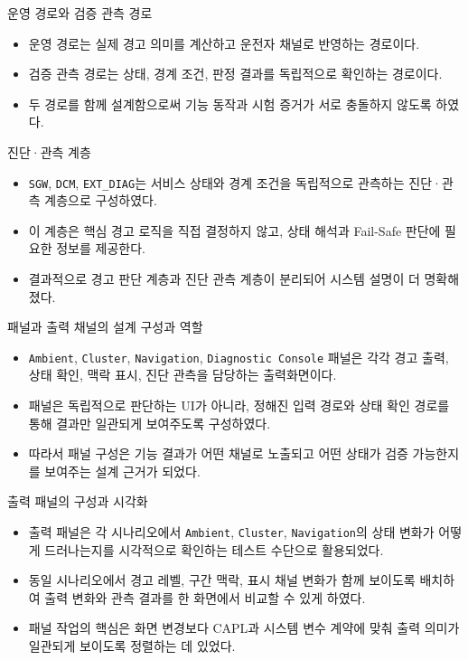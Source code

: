 \documentclass[aspectratio=169,10pt]{beamer}
\begin{document}
\begin{frame}{운영 경로와 검증 관측 경로}
\begin{itemize}
  \item 운영 경로는 실제 경고 의미를 계산하고 운전자 채널로 반영하는 경로이다.
  \item 검증 관측 경로는 상태, 경계 조건, 판정 결과를 독립적으로 확인하는 경로이다.
  \item 두 경로를 함께 설계함으로써 기능 동작과 시험 증거가 서로 충돌하지 않도록 하였다.
\end{itemize}
\end{frame}

\begin{frame}{진단·관측 계층}
\begin{itemize}
  \item \texttt{SGW}, \texttt{DCM}, \texttt{EXT\_DIAG}는 서비스 상태와 경계 조건을 독립적으로 관측하는 진단·관측 계층으로 구성하였다.
  \item 이 계층은 핵심 경고 로직을 직접 결정하지 않고, 상태 해석과 Fail-Safe 판단에 필요한 정보를 제공한다.
  \item 결과적으로 경고 판단 계층과 진단 관측 계층이 분리되어 시스템 설명이 더 명확해졌다.
\end{itemize}
\end{frame}

\begin{frame}{패널과 출력 채널의 설계 구성과 역할}
\begin{itemize}
  \item \texttt{Ambient}, \texttt{Cluster}, \texttt{Navigation}, \texttt{Diagnostic Console} 패널은 각각 경고 출력, 상태 확인, 맥락 표시, 진단 관측을 담당하는 출력화면이다.
  \item 패널은 독립적으로 판단하는 UI가 아니라, 정해진 입력 경로와 상태 확인 경로를 통해 결과만 일관되게 보여주도록 구성하였다.
  \item 따라서 패널 구성은 기능 결과가 어떤 채널로 노출되고 어떤 상태가 검증 가능한지를 보여주는 설계 근거가 되었다.
\end{itemize}
\end{frame}

\begin{frame}{출력 패널의 구성과 시각화}
\begin{itemize}
  \item 출력 패널은 각 시나리오에서 \texttt{Ambient}, \texttt{Cluster}, \texttt{Navigation}의 상태 변화가 어떻게 드러나는지를 시각적으로 확인하는 테스트 수단으로 활용되었다.
  \item 동일 시나리오에서 경고 레벨, 구간 맥락, 표시 채널 변화가 함께 보이도록 배치하여 출력 변화와 관측 결과를 한 화면에서 비교할 수 있게 하였다.
  \item 패널 작업의 핵심은 화면 변경보다 CAPL과 시스템 변수 계약에 맞춰 출력 의미가 일관되게 보이도록 정렬하는 데 있었다.
\end{itemize}
\end{frame}
\end{document}
